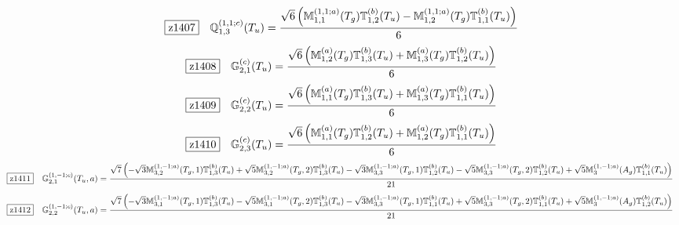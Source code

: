 \documentclass[fleqn,10pt,landscape]{jsarticle}
\begin{document}
\begin{dmath*}
\hspace*{3mm}\fbox{z1407}\quad \mathbb{Q}_{1,3}^{(1,1;c)}(T_{u})=\frac{\sqrt{6} \left(\mathbb{M}_{1,1}^{(1,1;a)}(T_{g}) \mathbb{T}_{1,2}^{(b)}(T_{u}) - \mathbb{M}_{1,2}^{(1,1;a)}(T_{g}) \mathbb{T}_{1,1}^{(b)}(T_{u})\right)}{6}
\end{dmath*}
\begin{dmath*}
\hspace*{3mm}\fbox{z1408}\quad \mathbb{G}_{2,1}^{(c)}(T_{u})=\frac{\sqrt{6} \left(\mathbb{M}_{1,2}^{(a)}(T_{g}) \mathbb{T}_{1,3}^{(b)}(T_{u}) + \mathbb{M}_{1,3}^{(a)}(T_{g}) \mathbb{T}_{1,2}^{(b)}(T_{u})\right)}{6}
\end{dmath*}
\begin{dmath*}
\hspace*{3mm}\fbox{z1409}\quad \mathbb{G}_{2,2}^{(c)}(T_{u})=\frac{\sqrt{6} \left(\mathbb{M}_{1,1}^{(a)}(T_{g}) \mathbb{T}_{1,3}^{(b)}(T_{u}) + \mathbb{M}_{1,3}^{(a)}(T_{g}) \mathbb{T}_{1,1}^{(b)}(T_{u})\right)}{6}
\end{dmath*}
\begin{dmath*}
\hspace*{3mm}\fbox{z1410}\quad \mathbb{G}_{2,3}^{(c)}(T_{u})=\frac{\sqrt{6} \left(\mathbb{M}_{1,1}^{(a)}(T_{g}) \mathbb{T}_{1,2}^{(b)}(T_{u}) + \mathbb{M}_{1,2}^{(a)}(T_{g}) \mathbb{T}_{1,1}^{(b)}(T_{u})\right)}{6}
\end{dmath*}
\begin{dmath*}
\hspace*{3mm}\fbox{z1411}\quad \mathbb{G}_{2,1}^{(1,-1;c)}(T_{u},a)=\frac{\sqrt{7} \left(- \sqrt{3} \mathbb{M}_{3,2}^{(1,-1;a)}(T_{g},1) \mathbb{T}_{1,3}^{(b)}(T_{u}) + \sqrt{5} \mathbb{M}_{3,2}^{(1,-1;a)}(T_{g},2) \mathbb{T}_{1,3}^{(b)}(T_{u}) - \sqrt{3} \mathbb{M}_{3,3}^{(1,-1;a)}(T_{g},1) \mathbb{T}_{1,2}^{(b)}(T_{u}) - \sqrt{5} \mathbb{M}_{3,3}^{(1,-1;a)}(T_{g},2) \mathbb{T}_{1,2}^{(b)}(T_{u}) + \sqrt{5} \mathbb{M}_{3}^{(1,-1;a)}(A_{g}) \mathbb{T}_{1,1}^{(b)}(T_{u})\right)}{21}
\end{dmath*}
\begin{dmath*}
\hspace*{3mm}\fbox{z1412}\quad \mathbb{G}_{2,2}^{(1,-1;c)}(T_{u},a)=\frac{\sqrt{7} \left(- \sqrt{3} \mathbb{M}_{3,1}^{(1,-1;a)}(T_{g},1) \mathbb{T}_{1,3}^{(b)}(T_{u}) - \sqrt{5} \mathbb{M}_{3,1}^{(1,-1;a)}(T_{g},2) \mathbb{T}_{1,3}^{(b)}(T_{u}) - \sqrt{3} \mathbb{M}_{3,3}^{(1,-1;a)}(T_{g},1) \mathbb{T}_{1,1}^{(b)}(T_{u}) + \sqrt{5} \mathbb{M}_{3,3}^{(1,-1;a)}(T_{g},2) \mathbb{T}_{1,1}^{(b)}(T_{u}) + \sqrt{5} \mathbb{M}_{3}^{(1,-1;a)}(A_{g}) \mathbb{T}_{1,2}^{(b)}(T_{u})\right)}{21}
\end{dmath*}
\end{document}
